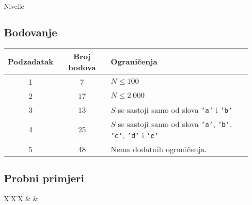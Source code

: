 \begin{statement}[
  problempoints=110,
  timelimit=1 sekunda,
  memorylimit=512 MiB,
]{Nivelle}
 \subsection*{Bodovanje}
{\renewcommand{\arraystretch}{1.4}
  \setlength{\tabcolsep}{6pt}
  \begin{tabular}{ccl}
 Podzadatak & Broj bodova & Ograničenja \\ \midrule
  1 & 7 & $N \le 100$ \\
  2 & 17 & $N \le 2\ 000$ \\
  3 & 13 & $S$ se sastoji samo od slova \texttt{'a'} i \texttt{'b'} \\
  4 & 25 & $S$ se sastoji samo od slova  \texttt{'a'}, \texttt{'b'},
               \texttt{'c'}, \texttt{'d'} i \texttt{'e'} \\
  5 & 48 & Nema dodatnih ograničenja.
\end{tabular}}

\subsection*{Probni primjeri}
\begin{tabularx}{\textwidth}{X'X'X}
 &
 &
\end{tabularx}

\end{statement}

